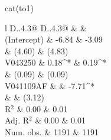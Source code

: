 \begin{Schunk}
\begin{Sinput}
 cat(to1)
\end{Sinput}
\begin{Soutput}
\begin{table}
\begin{center}
\begin{tabular}{l D{.}{.}{4.3}@{} D{.}{.}{4.3}@{} }
\toprule
            &  &  \\
\midrule
(Intercept) & -6.84    & -3.09     \\
            & (4.60)   & (4.83)    \\
V043250     & 0.18^{*} & 0.19^{*}  \\
            & (0.09)   & (0.09)    \\
V041109AF   &          & -7.71^{*} \\
            &          & (3.12)    \\
\midrule
R$^2$       & 0.00     & 0.01      \\
Adj. R$^2$  & 0.00     & 0.01      \\
Num. obs.   & 1191     & 1191      \\
\bottomrule
{}
\end{tabular}
\caption{Statistical models}
\label{table:coefficients}
\end{center}
\end{table}
\end{Soutput}
\end{Schunk}
